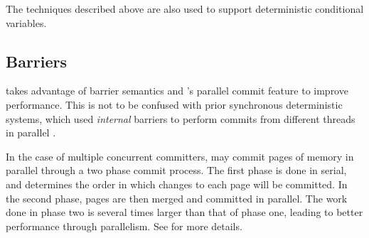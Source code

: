 
The techniques described above are also used to support deterministic conditional variables.

\subsection{Barriers}

\lib{} takes advantage of barrier semantics and \conversion{}'s parallel commit feature to improve performance. This is not to be confused with prior synchronous deterministic systems, which used \emph{internal} barriers to perform commits from different threads in parallel \cite{bergan_coredet:_2010,jooybar_gpudet:_2013}.

In the case of multiple concurrent committers, \conversion{} may commit pages of memory in parallel through a two phase commit process. The first phase is done in serial, and %
determines the order in which changes to each page will be committed. In the second phase, pages are then merged and committed in parallel.
 The work done in phase two is several times larger than that of phase one, leading to better performance through parallelism. 
See \cite{merrifield_conversion:_2013} for more details.

